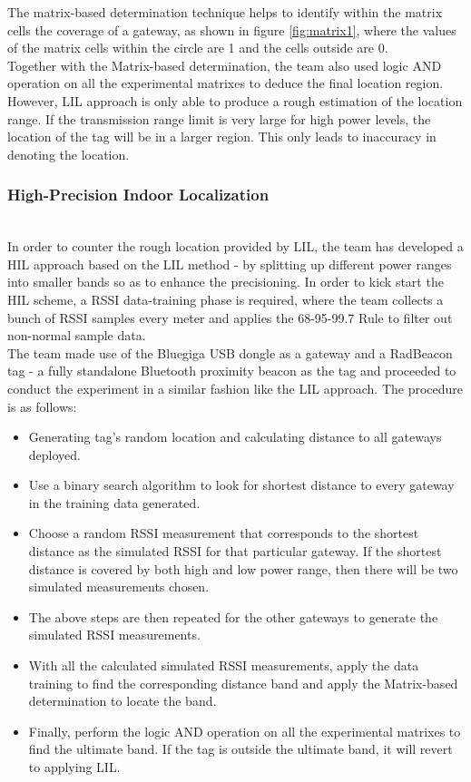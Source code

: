 \documentclass{l4proj}
\begin{document}
The matrix-based determination technique helps to identify within the matrix cells the coverage of a gateway, as shown in figure \ref{fig:matrix1}, where the values of the matrix cells within the circle are 1 and the cells outside are 0.\\
Together with the Matrix-based determination, the team also used logic AND operation on all the experimental matrixes to deduce the final location region. However, LIL approach is only able to produce a rough estimation of the location range. If the transmission range limit is very large for high power levels, the location of the tag will be in a larger region. This only leads to inaccuracy in denoting the location.\cite{problemlil}\\
\subsubsection{High-Precision Indoor Localization}~\\
In order to counter the rough location provided by LIL, the team has developed a HIL approach based on the LIL method - by splitting up different power ranges into smaller bands so as to enhance the precisioning. In order to kick start the HIL scheme, a RSSI data-training phase is required, where the team collects a bunch of RSSI samples every meter and applies the 68-95-99.7 Rule \cite{filterrule} to filter out non-normal sample data. \cite{hil}\\
The team made use of the Bluegiga USB dongle as a gateway and a RadBeacon tag - a fully standalone Bluetooth proximity beacon as the tag and proceeded to conduct the experiment in a similar fashion like the LIL approach. The procedure is as follows:
\begin{itemize}
\item
Generating tag's random location and calculating distance to all gateways deployed.
\item
Use a binary search algorithm to look for shortest distance to every gateway in the training data generated.
\item
Choose a random RSSI measurement that corresponds to the shortest distance as the simulated RSSI for that particular gateway. If the shortest distance is covered by both high and low power range, then there will be two simulated measurements chosen.
\item
The above steps are then repeated for the other gateways to generate the simulated RSSI measurements.
\item
With all the calculated simulated RSSI measurements, apply the data training to find the corresponding distance band and apply the Matrix-based determination to locate the band.
\item
Finally, perform the logic AND operation on all the experimental matrixes to find the ultimate band. If the tag is outside the ultimate band, it will revert to applying LIL.
\end{itemize}
\pagebreak
\end{document}
